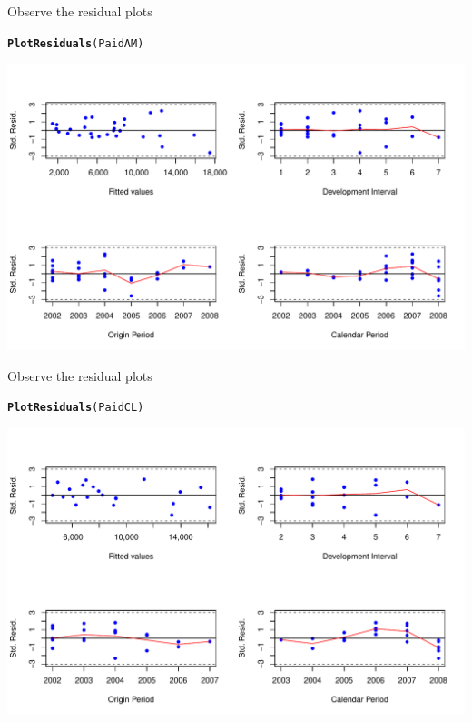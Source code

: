 \documentclass[xcolor=dvipsnames]{beamer}\usepackage{graphicx, color}
\makeatletter
\def\maxwidth{ %
  \ifdim\Gin@nat@width>\linewidth
    \linewidth
  \else
    \Gin@nat@width
  \fi
}
\newcommand{\hlfunctioncall}[1]{\textcolor[rgb]{0.501960784313725,0,0.329411764705882}{\textbf{#1}}}%
\newenvironment{kframe}{%
 \def\at@end@of@kframe{}%
 \ifinner\ifhmode%
  \def\at@end@of@kframe{\end{minipage}}%
  \begin{minipage}{\columnwidth}%
 \fi\fi%
 \def\FrameCommand##1{\hskip\@totalleftmargin \hskip-\fboxsep
 \colorbox{shadecolor}{##1}\hskip-\fboxsep
     \hskip-\linewidth \hskip-\@totalleftmargin \hskip\columnwidth}%
 \MakeFramed {\advance\hsize-\width
   \@totalleftmargin\z@ \linewidth\hsize
   \@setminipage}}%
 {\par\unskip\endMakeFramed%
 \at@end@of@kframe}
\newenvironment{knitrout}{}{} %
\makeatother
\begin{document}
\begin{frame}[fragile]{Observe the residual plots}
\begin{knitrout}
\color{fgcolor}\begin{kframe}
\begin{alltt}
\hlfunctioncall{PlotResiduals}(PaidAM)
\end{alltt}
\end{kframe}
\includegraphics[width=\maxwidth]{figure/ResidualPlotsAM2} 

\end{knitrout}

\end{frame}

\begin{frame}[fragile]{Observe the residual plots}
\begin{knitrout}
\color{fgcolor}\begin{kframe}
\begin{alltt}
\hlfunctioncall{PlotResiduals}(PaidCL)
\end{alltt}
\end{kframe}
\includegraphics[width=\maxwidth]{figure/ResidualPlotsCL} 

\end{knitrout}

\end{frame}
\end{document}
